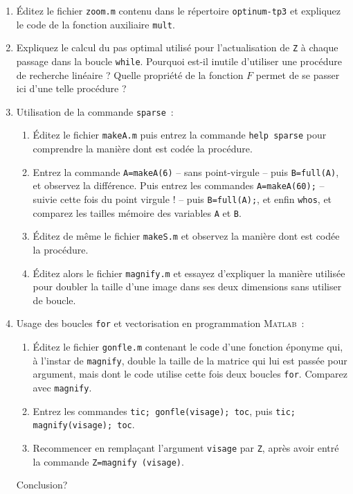\documentclass[10pt,a4paper,fleqn]{report}
\newcommand{\matlab}{\textsc{Matlab}}
\newcommand{\onit}{\begin{enumerate}}
\newcommand{\offit}{\end{enumerate}}
\renewcommand{\tt}{\texttt}
\begin{document}
\onit
\item \'Editez le fichier \tt{zoom.m} contenu dans le répertoire \tt{optinum-tp3} et expliquez le code de la fonction auxiliaire \tt{mult}. 
\item Expliquez le calcul du pas optimal utilisé pour l'actualisation de \tt Z à chaque passage dans la boucle \tt{while}. Pourquoi est-il inutile d'utiliser une procédure de recherche linéaire ? Quelle propriété de la fonction $F$ permet de se passer ici d'une telle procédure ? 
\item Utilisation de la commande \tt{sparse}~:
\onit
\item \'Editez le fichier \tt{makeA.m} puis entrez la commande \tt{help sparse} pour comprendre la manière dont est codée la procédure.
\item Entrez la commande \tt{A=makeA(6)} -- sans point-virgule -- puis \tt{B=full(A)}, et observez la différence. Puis entrez les commandes \tt{A=makeA(60);} -- suivie cette fois du point virgule ! -- puis \tt{B=full(A);}, et enfin \tt{whos}, et comparez les tailles mémoire des variables \tt A et \tt B.
\item \'Editez de même le fichier \tt{makeS.m} et observez la manière dont est codée la procédure.
\item \'Editez alors le fichier \tt{magnify.m} et essayez d'expliquer la manière utilisée pour doubler la taille d'une image dans ses deux dimensions sans utiliser de boucle.
\offit
\item Usage des boucles \tt{for} et vectorisation en programmation \matlab~:
\onit
\item \'Editez le fichier \tt{gonfle.m} contenant le code d'une fonction éponyme qui, à l'instar de \tt{magnify}, double la taille de la matrice qui lui est passée pour argument, mais dont le code utilise cette fois deux boucles \tt{for}. Comparez avec \tt{magnify}. 
\item Entrez les commandes \tt{tic; gonfle(visage); toc}, puis \tt{tic; magnify(visage); toc}.
\item Recommencer en remplaçant l'argument \tt{visage} par \tt{Z}, après avoir entré la commande \tt{Z=magnify (visage)}.
\offit
Conclusion?
\offit
\end{document}
